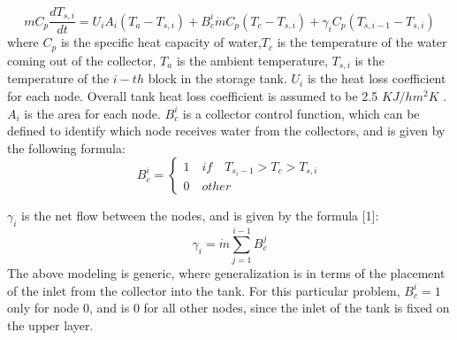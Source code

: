 \documentclass{article}
\begin{document}
\begin{equation}
mC_p \frac{dT_{s, i}}{dt} = U_i A_i (T_a - T_{s,i}) + B_c^i \dot{m} C_p (T_c - T_{s,i}) + \gamma_i C_p (T_{s, i-1} - T_{s,i})
\end{equation}
where $C_p$ is the specific heat capacity of water,$T_c$ is the temperature of the water coming out of the collector, $T_a$ is the ambient temperature, $T_{s, i}$ is the temperature of the $i-th$ block in the storage tank.  $U_i$ is the heat loss coefficient for each node. Overall tank heat loss coefficient is assumed to be 2.5 $KJ/h m^2 K$ . $A_i$ is the area for each node.
$B_c^i$ is a collector control function, which can be defined to identify which node receives water from the collectors, and is given by the following formula:
\begin{equation}
B_c^i = 
\begin{cases}
 1 \quad if \quad T_{s_i-1} > T_c > T_{s,i} \\
 0 \quad other  
\end{cases}
\end{equation}

$\gamma_i$ is the net flow between the nodes, and is given by the formula [1]:
\begin{equation}
\gamma_i = \dot{m} \sum_{j = 1} ^{i-1} B_c^j
\end{equation}
The above modeling is generic, where generalization is in terms of the placement of the inlet from the collector into the tank. For this particular problem, $B_c^i = 1$ only for node $0$, and is $0$ for all other nodes, since the inlet of the tank is fixed on the upper layer.
\end{document}
